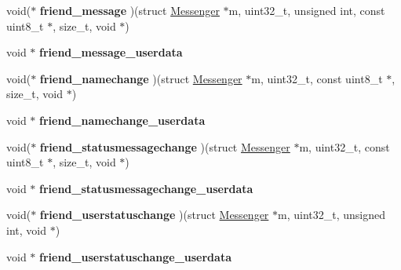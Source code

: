 \begin{DoxyCompactItemize}
\item 
\hypertarget{struct_messenger_a85d35646398022de4e435174f990ce18}{void($\ast$ {\bfseries friend\+\_\+message} )(struct \hyperlink{struct_messenger}{Messenger} $\ast$m, uint32\+\_\+t, unsigned int, const uint8\+\_\+t $\ast$, size\+\_\+t, void $\ast$)}\label{struct_messenger_a85d35646398022de4e435174f990ce18}

\item 
\hypertarget{struct_messenger_a2b0701803305a0b99a2d3f016300b900}{void $\ast$ {\bfseries friend\+\_\+message\+\_\+userdata}}\label{struct_messenger_a2b0701803305a0b99a2d3f016300b900}

\item 
\hypertarget{struct_messenger_a108f796a6b45966363b7bd8a64f366f8}{void($\ast$ {\bfseries friend\+\_\+namechange} )(struct \hyperlink{struct_messenger}{Messenger} $\ast$m, uint32\+\_\+t, const uint8\+\_\+t $\ast$, size\+\_\+t, void $\ast$)}\label{struct_messenger_a108f796a6b45966363b7bd8a64f366f8}

\item 
\hypertarget{struct_messenger_a0a5f95c8ffcd6a9a0dafd21c34be2e0a}{void $\ast$ {\bfseries friend\+\_\+namechange\+\_\+userdata}}\label{struct_messenger_a0a5f95c8ffcd6a9a0dafd21c34be2e0a}

\item 
\hypertarget{struct_messenger_a5badb1433338f70899baee5abcf5f0a5}{void($\ast$ {\bfseries friend\+\_\+statusmessagechange} )(struct \hyperlink{struct_messenger}{Messenger} $\ast$m, uint32\+\_\+t, const uint8\+\_\+t $\ast$, size\+\_\+t, void $\ast$)}\label{struct_messenger_a5badb1433338f70899baee5abcf5f0a5}

\item 
\hypertarget{struct_messenger_adeec8efd452cd609070c2eee12826fb9}{void $\ast$ {\bfseries friend\+\_\+statusmessagechange\+\_\+userdata}}\label{struct_messenger_adeec8efd452cd609070c2eee12826fb9}

\item 
\hypertarget{struct_messenger_a61d62ee2f1f496b742acdcdf2c02f388}{void($\ast$ {\bfseries friend\+\_\+userstatuschange} )(struct \hyperlink{struct_messenger}{Messenger} $\ast$m, uint32\+\_\+t, unsigned int, void $\ast$)}\label{struct_messenger_a61d62ee2f1f496b742acdcdf2c02f388}

\item 
\hypertarget{struct_messenger_a1007bf7131bf75ddd1980ed1b610e6f7}{void $\ast$ {\bfseries friend\+\_\+userstatuschange\+\_\+userdata}}\label{struct_messenger_a1007bf7131bf75ddd1980ed1b610e6f7}


\end{DoxyCompactItemize}

